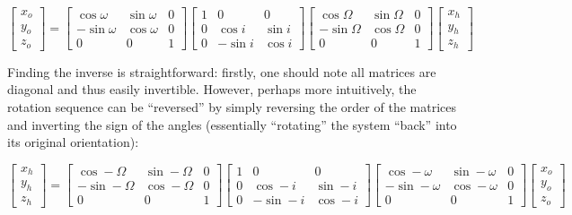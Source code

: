 \documentclass[a4paper,10pt]{article}
\begin{document}
\begin{equation}
 \begin{bmatrix}
  x_o \\ y_o \\ z_o
 \end{bmatrix}
 =
 \begin{bmatrix}
  \cos \omega & \sin \omega & 0 \\
  - \sin \omega & \cos \omega & 0 \\
  0 & 0 & 1
 \end{bmatrix}
 \begin{bmatrix}
  1 & 0 & 0 \\
  0 & \cos i & \sin i \\
  0 & -\sin i & \cos i
 \end{bmatrix}
 \begin{bmatrix}
  \cos \Omega & \sin \Omega & 0 \\
  - \sin \Omega & \cos \Omega & 0 \\
  0 & 0 & 1
 \end{bmatrix}
 \begin{bmatrix}
  x_h \\ y_h \\ z_h
 \end{bmatrix}
\end{equation}

Finding the inverse is straightforward: firstly, one should note all matrices are diagonal and thus easily invertible. However, perhaps more intuitively, the rotation sequence can be ``reversed'' by simply reversing the order of the matrices and inverting the sign of the angles (essentially ``rotating'' the system ``back'' into its original orientation):

\begin{equation}
 \begin{bmatrix}
  x_h \\ y_h \\ z_h
 \end{bmatrix}
 =
 \begin{bmatrix}
  \cos -\Omega & \sin -\Omega & 0 \\
  -\sin -\Omega & \cos -\Omega & 0 \\
  0 & 0 & 1
 \end{bmatrix}
 \begin{bmatrix}
  1 & 0 & 0 \\
  0 & \cos -i & \sin -i \\
  0 & -\sin -i & \cos -i
 \end{bmatrix}
 \begin{bmatrix}
  \cos -\omega & \sin -\omega & 0 \\
  - \sin -\omega & \cos -\omega & 0 \\
  0 & 0 & 1
 \end{bmatrix}
 \begin{bmatrix}
  x_o \\ y_o \\ z_o
 \end{bmatrix}
\end{equation}
\end{document}
